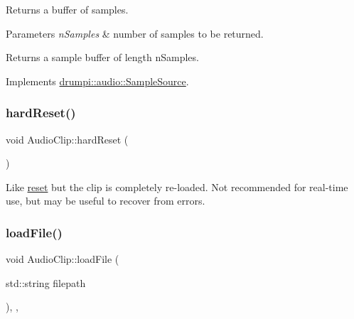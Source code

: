 Returns a buffer of samples. 
\begin{DoxyParams}{Parameters}
{\em n\+Samples} & number of samples to be returned. \\
\hline
\end{DoxyParams}
\begin{DoxyReturn}{Returns}
a sample buffer of length n\+Samples. 
\end{DoxyReturn}


Implements \hyperlink{classdrumpi_1_1audio_1_1SampleSource_ab3f12884325b818ebe088dec5daa15cd}{drumpi\+::audio\+::\+Sample\+Source}.

\mbox{\label{classdrumpi_1_1audio_1_1AudioClip_a9696d29532e37f6ea04c6353f0e3748b}} 
\subsubsection{\texorpdfstring{hard\+Reset()}{hardReset()}}
{\footnotesize\ttfamily void Audio\+Clip\+::hard\+Reset (\begin{DoxyParamCaption}{ }\end{DoxyParamCaption})}

Like \hyperlink{classdrumpi_1_1audio_1_1AudioClip_ac870bf37050afae302754c4e4671d779}{reset} but the clip is completely re-\/loaded. Not recommended for real-\/time use, but may be useful to recover from errors. \mbox{\label{classdrumpi_1_1audio_1_1AudioClip_af00b5d353bec63b6bbbbe58509b95fe3}} 
\subsubsection{\texorpdfstring{load\+File()}{loadFile()}}
{\footnotesize\ttfamily void Audio\+Clip\+::load\+File (\begin{DoxyParamCaption}\item[{std\+::string}]{filepath }\end{DoxyParamCaption})\hspace{0.3cm}{\ttfamily [override]}, {\ttfamily [private]}, {\ttfamily [virtual]}}

